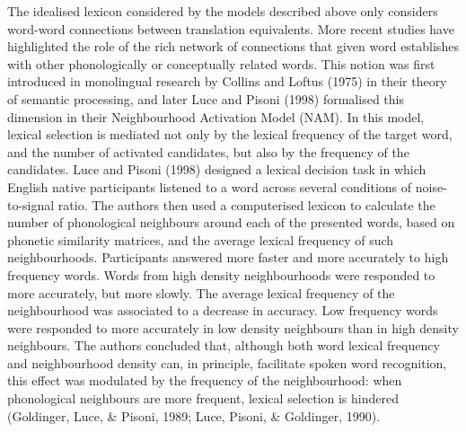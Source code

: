 \documentclass[
  english,
  man,floatsintext]{apa6}
\begin{document}
The idealised lexicon considered by the models described above only considers word-word connections between translation equivalents. More recent studies have highlighted the role of the rich network of connections that given word establishes with other phonologically or conceptually related words. This notion was first introduced in monolingual research by Collins and Loftus (1975) in their theory of semantic processing, and later Luce and Pisoni (1998) formalised this dimension in their Neighbourhood Activation Model (NAM). In this model, lexical selection is mediated not only by the lexical frequency of the target word, and the number of activated candidates, but also by the frequency of the candidates. Luce and Pisoni (1998) designed a lexical decision task in which English native participants listened to a word across several conditions of noise-to-signal ratio. The authors then used a computerised lexicon to calculate the number of phonological neighbours around each of the presented words, based on phonetic similarity matrices, and the average lexical frequency of such neighbourhoods. Participants answered more faster and more accurately to high frequency words. Words from high density neighbourhoods were responded to more accurately, but more slowly. The average lexical frequency of the neighbourhood was associated to a decrease in accuracy. Low frequency words were responded to more accurately in low density neighbours than in high density neighbours. The authors concluded that, although both word lexical frequency and neighbourhood density can, in principle, facilitate spoken word recognition, this effect was modulated by the frequency of the neighbourhood: when phonological neighbours are more frequent, lexical selection is hindered (Goldinger, Luce, \& Pisoni, 1989; Luce, Pisoni, \& Goldinger, 1990).
\end{document}

